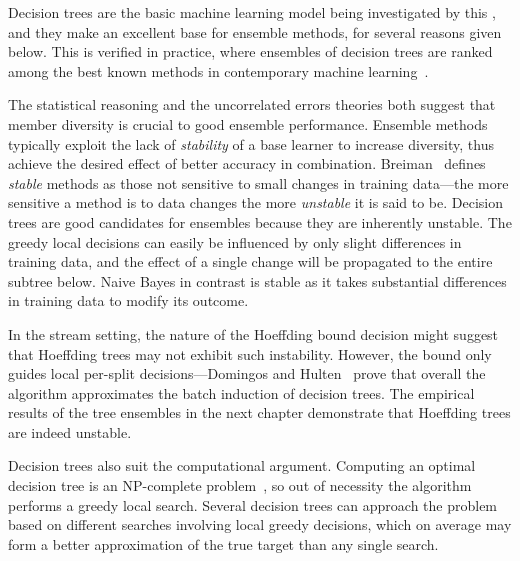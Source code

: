 Decision trees are the basic machine learning model being investigated by this \thesisc, and they make an excellent base for ensemble methods, for several reasons given below. This is verified in practice,
where ensembles of decision trees are ranked among the best known methods
in contemporary machine learning~\cite{mlcomparison}.

The statistical reasoning and the uncorrelated errors theories both suggest that member diversity is crucial to good ensemble performance.
Ensemble methods typically exploit the lack of {\em stability} of a base
learner to increase diversity, thus achieve the desired effect of better accuracy in combination.
Breiman~\cite{bagging} defines {\em stable} methods as those not sensitive to small changes in training data---the more sensitive a method is to data changes the more {\em unstable} it is said to be.
Decision trees are good candidates for ensembles because they are
inherently unstable. The greedy local decisions can easily be influenced by only slight differences in training data, and the effect of a single change will be propagated to the entire subtree below. Naive Bayes in contrast is stable as it takes substantial differences in training data to modify its outcome.

In the stream setting, the nature of the Hoeffding bound decision
might suggest that Hoeffding trees may not exhibit such instability.
However, the bound only guides local per-split decisions---Domingos
and Hulten~\cite{vfdt} prove that overall the algorithm approximates the batch
induction of decision trees. The empirical results of the tree
ensembles in the next chapter demonstrate that Hoeffding trees are indeed unstable.

Decision trees also suit the computational argument. Computing an optimal decision tree is an NP-complete problem~\cite{optimaldtnp}, so out of necessity the algorithm performs a greedy local search. Several decision trees can approach the problem based on different searches involving local greedy decisions, which on average may form a better approximation of the true target than any single search.

